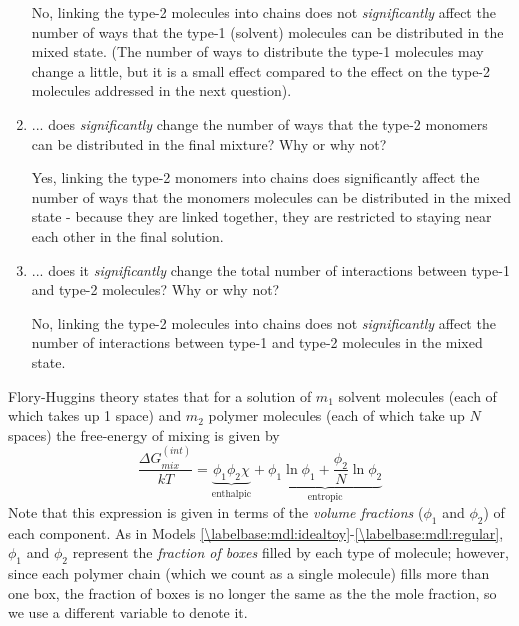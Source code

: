 \begin{activity}
\begin{ctqs}
\begin{enumerate}
				\begin{solution}[1in]
					No, linking the type-2 molecules into chains does not \emph{significantly} affect the number of ways that the type-1 (solvent) molecules can be distributed in the mixed state.  (The number of ways to distribute the type-1 molecules may change a little, but it is a small effect compared to the effect on the type-2 molecules addressed in the next question).
				\end{solution}
			
			\item ... does \emph{significantly} change the number of ways that the type-2 monomers can be distributed in the final mixture?  Why or why not?
				\label{\labelbase:ctq:FHtype2}
			
				\begin{solution}[0.9in]
					Yes, linking the type-2 monomers into chains does  significantly affect the number of ways that the monomers molecules can be distributed in the mixed state - because they are linked together, they are restricted to staying near each other in the final solution.
				\end{solution}
			
			\item ... does it \emph{significantly} change the total number of interactions between type-1 and type-2 molecules?  Why or why not?
				\label{\labelbase:ctq:FHinteraction}
			
				\begin{solution}[0.9in]
					No, linking the type-2 molecules into chains does not \emph{significantly} affect the number of interactions between type-1 and type-2 molecules in the mixed state.
				\end{solution}
				
		\end{enumerate}
	
\end{ctqs}

\begin{infobox}
	Flory-Huggins theory states that for a solution of $m_1$ solvent molecules (each of which takes up 1 space) and $m_2$ polymer molecules (each of which take up $N$ spaces) the free-energy of mixing is given by
	\begin{equation*}
		\frac{\Delta G_{mix}^{(int)}}{kT} = \underbrace{\phi_1 \phi_2 \chi}_{\text{enthalpic}} + \underbrace{\phi_1 \ln \phi_1 + \frac{\phi_2}{N} \ln \phi_2}_{\text{entropic}}
	\end{equation*}
	Note that this expression is given in terms of the \emph{volume fractions} ($\phi_1$ and $\phi_2$) of each component.  As in Models \ref{\labelbase:mdl:idealtoy}-\ref{\labelbase:mdl:regular}, $\phi_1$ and $\phi_2$ represent the \emph{fraction of boxes} filled by each type of molecule; however, since each polymer chain (which we count as a single molecule) fills more than one box, the fraction of boxes is no longer the same as the the mole fraction, so we use a different variable to denote it.
	

\end{infobox}
\end{activity}
